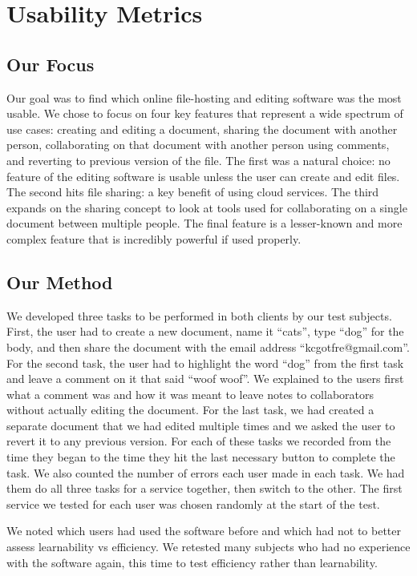 \documentclass[a4paper,12pt]{article}
\begin{document}
\section{Usability Metrics}

\subsection{Our Focus}
Our goal was to find which online file-hosting and editing software was the most usable. We chose to focus on four key features that represent a wide spectrum of use cases: creating and editing a document, sharing the document with another person, collaborating on that document with another person using comments, and reverting to previous version of the file. The first was a natural choice: no feature of the editing software is usable unless the user can create and edit files. The second hits file sharing: a key benefit of using cloud services. The third expands on the sharing concept to look at tools used for collaborating on a single document between multiple people. The final feature is a lesser-known and more complex feature that is incredibly powerful if used properly.

\subsection{Our Method}

We developed three tasks to be performed in both clients by our test subjects. First, the user had to create a new document, name it ``cats'', type ``dog'' for the body, and then share the document with the email address ``kcgotfre@gmail.com''. For the second task, the user had to highlight the word ``dog'' from the first task and leave a comment on it that said ``woof woof''. We explained to the users first what a comment was and how it was meant to leave notes to collaborators without actually editing the document. For the last task, we had created a separate document that we had edited multiple times and we asked the user to revert it to any previous version. For each of these tasks we recorded from the time they began to the time they hit the last necessary button to complete the task. We also counted the number of errors each user made in each task. We had them do all three tasks for a service together, then switch to the other. The first service we tested for each user was chosen randomly at the start of the test.

We noted which users had used the software before and which had not to better assess learnability vs efficiency. We retested many subjects who had no experience with the software again, this time to test efficiency rather than learnability.
\end{document}

